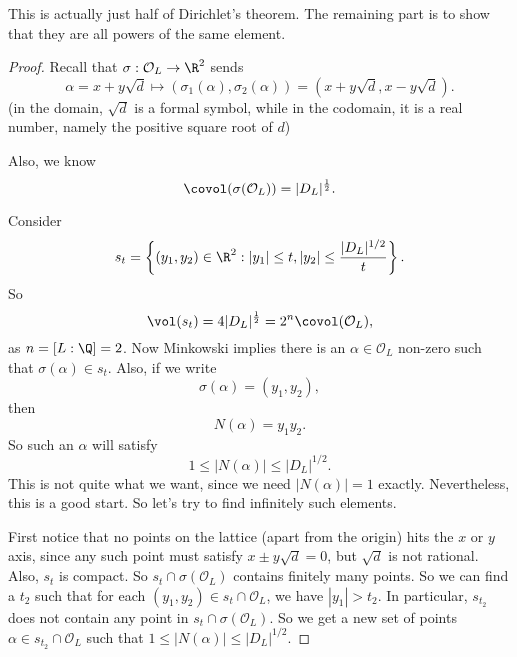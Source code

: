 \documentclass[a4paper]{article}
\begin{document}
This is actually just half of Dirichlet's theorem. The remaining part is to show that they are all powers of the same element.
\begin{proof}
  Recall that $\sigma: \mathcal{O}_L \to \R^2$ sends
  \[
    \alpha = x + y\sqrt{d} \mapsto (\sigma_1(\alpha), \sigma_2(\alpha)) = (x + y\sqrt{d}, x - y\sqrt{d}).
  \]
  (in the domain, $\sqrt{d}$ is a formal symbol, while in the codomain, it is a real number, namely the positive square root of $d$)

  Also, we know
  \[
    \covol(\sigma(\mathcal{O}_L)) = |D_L|^{\frac{1}{2}}.
  \]
  \begin{center}
  \end{center}
  Consider
  \[
    s_t = \left\{(y_1, y_2) \in \R^2: |y_1|\leq t, |y_2| \leq \frac{|D_L|^{1/2}}{t}\right\}.
  \]
  So
  \[
    \vol(s_t) = 4|D_L|^{\frac{1}{2}} = 2^n \covol(\mathcal{O}_L),
  \]
  as $n = [L:\Q] = 2$. Now Minkowski implies there is an $\alpha \in \mathcal{O}_L$ non-zero such that $\sigma(\alpha) \in s_t$. Also, if we write
  \[
    \sigma(\alpha) = (y_1, y_2),
  \]
  then
  \[
    N(\alpha) = y_1y_2.
  \]
  So such an $\alpha$ will satisfy
  \[
    1 \leq |N(\alpha)| \leq |D_L|^{1/2}.
  \]
  This is not quite what we want, since we need $|N(\alpha)| = 1$ exactly. Nevertheless, this is a good start. So let's try to find infinitely such elements.

  First notice that no points on the lattice (apart from the origin) hits the $x$ or $y$ axis, since any such point must satisfy $x \pm y\sqrt{d} = 0$, but $\sqrt{d}$ is not rational. Also, $s_t$ is compact. So $s_t \cap \sigma(\mathcal{O}_L)$ contains finitely many points. So we can find a $t_2$ such that for each $(y_1, y_2) \in s_t \cap \mathcal{O}_L$, we have $|y_1| > t_2$. In particular, $s_{t_2}$ does not contain any point in $s_t \cap \sigma(\mathcal{O}_L)$. So we get a new set of points $\alpha \in s_{t_2} \cap \mathcal{O}_L$ such that $1 \leq |N(\alpha)| \leq |D_L|^{1/2}$.


\end{proof}
\end{document}
